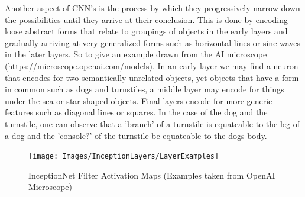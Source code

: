    Another aspect of CNN's is the process by which they progressively narrow down the possibilities until they arrive at their conclusion. This is done by encoding loose abstract forms that relate to groupings of objects in the early layers and gradually arriving at very generalized forms such as horizontal lines or sine waves in the later layers. So to give an example drawn from the AI microscope (https://microscope.openai.com/models). In an early layer  we may find a neuron that encodes for two semantically unrelated objects, yet objects that have a form in common such as dogs and turnstiles, a middle layer may encode for things under the sea or star shaped objects. Final layers encode for more generic features such as diagonal lines or squares. In the case of the dog and the turnstile, one can observe that a 'branch' of a turnstile is equateable to the leg of a dog and the 'console?' of the turnstile be equateable to the dogs body.

    \begin{landscape}
      \begin{figure}[H]
        \begin{center}
          \texttt{[image: Images/InceptionLayers/LayerExamples]}
          \caption{InceptionNet Filter Activation Maps (Examples taken from OpenAI Microscope)}
          \label{fig:inceptionNet_filter_activation}
        \end{center}
      \end{figure}
    \end{landscape}
    \par

  \newpage
